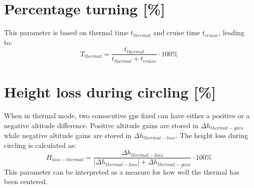 \section{Percentage turning [\%]}
This parameter is based on thermal time ${{t_{thermal}}}$ and cruise time ${{t_{cruise}}} $, leading to:
\begin{equation}
{T_{thermal}} = \frac{{{t_{thermal}}}}{{{t_{thermal}} + {t_{cruise}}}} \cdot 100\% 
\end{equation}

\section{Height loss during circling [\%]}
When in thermal mode, two consecutive gps fixed can have either a positive or a negative altitude difference. Positive altitude gains are stored in $\Delta {h_{thermal-gain}}$ while negative altitude gains are stored in ${\Delta {h_{thermal-loss}}}$. The height loss during circling is calculated as:
\begin{equation}
{H_{loss - thermal}} = \frac{{\Delta {h_{thermal - loss}}}}{{\left| {\Delta {h_{thermal - loss}}} \right| + \Delta {h_{thermal - gain}}}} \cdot 100\% 
\end{equation}
This parameter can be interpreted as a measure for how well the thermal has been centered.